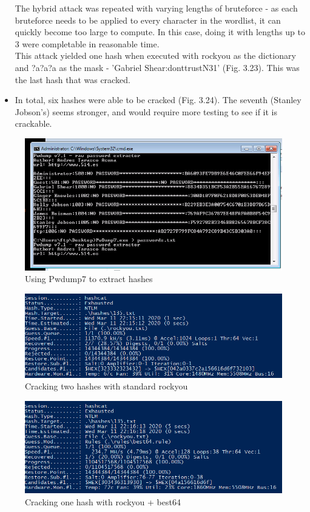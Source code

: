 \documentclass{report}
\begin{document}
\begin{itemize}
	The hybrid attack was repeated with varying lengths of bruteforce - as each bruteforce needs to be applied to every character in the wordlist, it can quickly become too large to compute. In this case, doing it with lengths up to 3 were completable in reasonable time.\\
	This attack yielded one hash when executed with rockyou as the dictionary and ?a?a?a as the mask - 'Gabriel Shear:donttrustN31' (Fig. 3.23). This was the last hash that was cracked.
	\item In total, six hashes were able to be cracked (Fig. 3.24). The seventh (Stanley Jobson's) seems stronger, and would require more testing to see if it is crackable.
\end{itemize}

\begin{figure}[!htb]
	\centering
	\includegraphics[scale=0.7]{img/hashdump1.png}
	\caption{Using Pwdump7 to extract hashes}
\end{figure}
\begin{figure}[!htb]
	\centering
	\includegraphics[scale=0.5]{img/hashdump2.png}
	\caption{Cracking two hashes with standard rockyou}
\end{figure}
\begin{figure}[!htb]
	\centering
	\includegraphics[scale=0.6]{img/hashdump3.png}
	\caption{Cracking one hash with rockyou + best64}
\end{figure}
\end{document}
